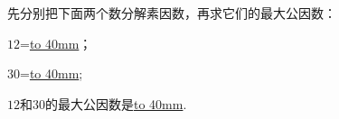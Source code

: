 先分别把下面两个数分解素因数，再求它们的最大公因数：

$12$=\underline{\hbox to 40mm{}}；

$30$=\underline{\hbox to 40mm{}};

$12$和$30$的最大公因数是\underline{\hbox to 40mm{}}.